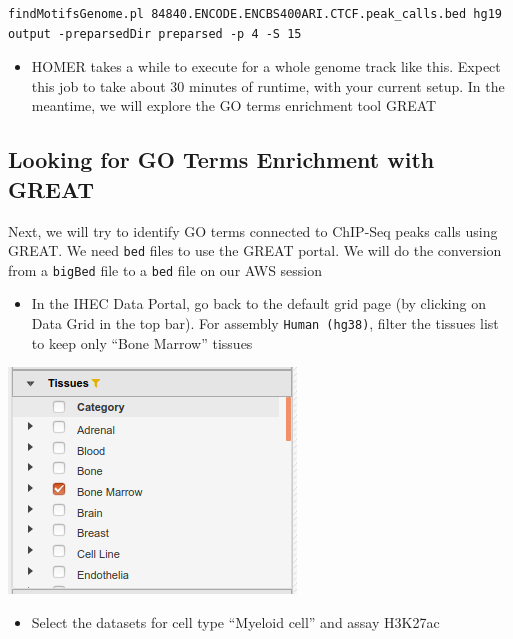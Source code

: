 \documentclass[
]{book}
\providecommand{\tightlist}{%
  \setlength{\itemsep}{0pt}\setlength{\parskip}{0pt}}
\begin{document}
\begin{verbatim}
findMotifsGenome.pl 84840.ENCODE.ENCBS400ARI.CTCF.peak_calls.bed hg19 output -preparsedDir preparsed -p 4 -S 15
\end{verbatim}

\begin{itemize}
\tightlist
\item
  HOMER takes a while to execute for a whole genome track like this. Expect this job to take about 30 minutes of runtime, with your current setup. In the meantime, we will explore the GO terms enrichment tool GREAT
\end{itemize}

\subsection{Looking for GO Terms Enrichment with GREAT}\label{looking-for-go-terms-enrichment-with-great}

Next, we will try to identify GO terms connected to ChIP-Seq peaks calls using GREAT. We need \texttt{bed} files to use the GREAT portal. We will do the conversion from a \texttt{bigBed} file to a \texttt{bed} file on our AWS session

\begin{itemize}
\tightlist
\item
  In the IHEC Data Portal, go back to the default grid page (by clicking on Data Grid in the top bar). For assembly \texttt{Human\ (hg38)}, filter the tissues list to keep only ``Bone Marrow'' tissues
\end{itemize}

\includegraphics{./img/GREAT_select_bone_marrow.png}

\begin{itemize}
\tightlist
\item
  Select the datasets for cell type ``Myeloid cell'' and assay H3K27ac
\end{itemize}
\end{document}
